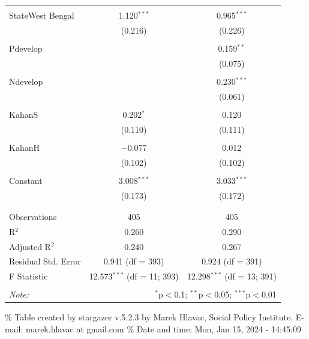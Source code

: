 \documentclass[
]{article}
\begin{document}
\begin{table}[!htbp]
\begin{tabular}{@{\extracolsep{5pt}}lcc}
  & & \\ 
 StateWest Bengal & 1.120$^{***}$ & 0.965$^{***}$ \\ 
  & (0.216) & (0.226) \\ 
  & & \\ 
 Pdevelop &  & 0.159$^{**}$ \\ 
  &  & (0.075) \\ 
  & & \\ 
 Ndevelop &  & 0.230$^{***}$ \\ 
  &  & (0.061) \\ 
  & & \\ 
 KahanS & 0.202$^{*}$ & 0.120 \\ 
  & (0.110) & (0.111) \\ 
  & & \\ 
 KahanH & $-$0.077 & 0.012 \\ 
  & (0.102) & (0.102) \\ 
  & & \\ 
 Constant & 3.008$^{***}$ & 3.033$^{***}$ \\ 
  & (0.173) & (0.172) \\ 
  & & \\ 
\hline \\[-1.8ex] 
Observations & 405 & 405 \\ 
R$^{2}$ & 0.260 & 0.290 \\ 
Adjusted R$^{2}$ & 0.240 & 0.267 \\ 
Residual Std. Error & 0.941 (df = 393) & 0.924 (df = 391) \\ 
F Statistic & 12.573$^{***}$ (df = 11; 393) & 12.298$^{***}$ (df = 13; 391) \\ 
\hline 
\hline \\[-1.8ex] 
\textit{Note:}  & \multicolumn{2}{r}{$^{*}$p$<$0.1; $^{**}$p$<$0.05; $^{***}$p$<$0.01} \\ 
\end{tabular} 
\end{table} 
\endgroup

\newpage

\begingroup\setlength{\tabcolsep}{1pt}

\renewcommand{\arraystretch}{0.7}

\% Table created by stargazer v.5.2.3 by Marek Hlavac, Social Policy
Institute. E-mail: marek.hlavac at gmail.com \% Date and time: Mon, Jan
15, 2024 - 14:45:09
\end{document}
